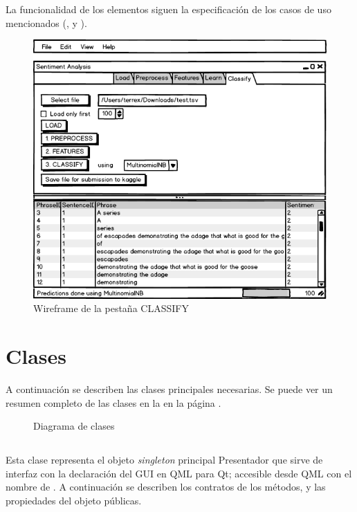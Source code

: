 La funcionalidad de los elementos siguen la especificación de los casos de uso mencionados (,  y ).

\begin{figure}[htbp]
\centering
\includegraphics[width=12cm,clip=true,trim=0 0 0 38pt]{gui-5-classify}
\caption{Wireframe de la pestaña CLASSIFY}
\label{fig:gui-5-classify}
\end{figure}


\section{Clases}

A continuación se describen las clases principales necesarias. Se puede ver un resumen completo de las clases en la  en la página \pageref{fig:classes}.

\begin{landscape}
\begin{figure}[htbp]
\centering
\resizebox{!}{0.99\textwidth}{}
\caption{Diagrama de clases}
\label{fig:classes}
\end{figure}
\end{landscape}

\subsection{}

Esta clase representa el objeto \emph{singleton} principal Presentador que sirve de interfaz con la declaración del GUI en QML para Qt; accesible desde QML con el nombre de . A continuación se describen los contratos de los métodos, y las propiedades del objeto públicas.


